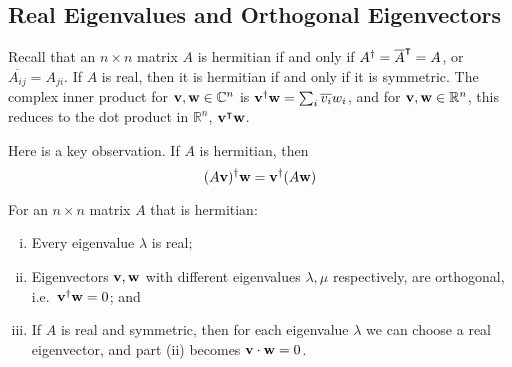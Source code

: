 \subsection{Real Eigenvalues and Orthogonal Eigenvectors}
Recall that an \(n\times n\) matrix \(A\) is hermitian if and only if \(A^\dagger = \overline{A}^\intercal = A\), or \(\overline{A_{ij}} = A_{ji}\).
If \(A\) is real, then it is hermitian if and only if it is symmetric.
The complex inner product for \(\vb v, \vb w \in \mathbb C^n\) is \(\vb v^\dagger \vb w = \sum_i \overline{v_i}w_i\), and for \(\vb v, \vb w \in \mathbb R^n\), this reduces to the dot product in \(\mathbb R^n\), \(\vb v^\intercal \vb w\).

Here is a key observation.
If \(A\) is hermitian, then
\[
	(A\vb v)^\dagger \vb w = \vb v^\dagger (A \vb w)
\]
\begin{theorem}
	For an \(n \times n\) matrix \(A\) that is hermitian:
	\begin{enumerate}[(i)]
		\item Every eigenvalue \(\lambda\) is real;
		\item Eigenvectors \(\vb v, \vb w\) with different eigenvalues \(\lambda, \mu\) respectively, are orthogonal, i.e.\ \(\vb v^\dagger \vb w = 0\); and
		\item If \(A\) is real and symmetric, then for each eigenvalue \(\lambda\) we can choose a real eigenvector, and part (ii) becomes \(\vb v \cdot \vb w = 0\).
	\end{enumerate}
\end{theorem}
